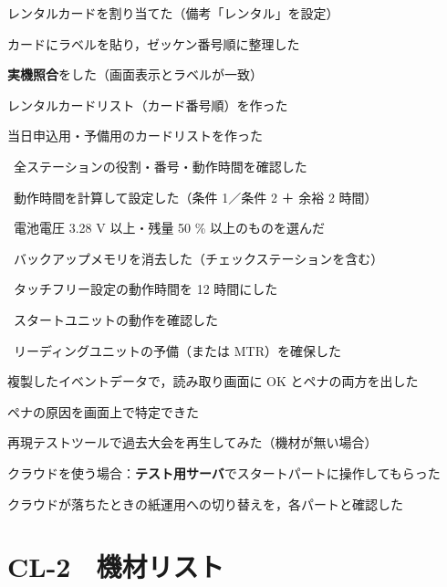 \begin{cklist}
\item レンタルカードを割り当てた（備考「レンタル」を設定）
\item カードにラベルを貼り，ゼッケン番号順に整理した
\item \textbf{実機照合}をした（画面表示とラベルが一致）
\item レンタルカードリスト（カード番号順）を作った
\item 当日申込用・予備用のカードリストを作った
\end{cklist}

\begin{cklist}
\item \tSI\ 全ステーションの役割・番号・動作時間を確認した
\item \tSI\ 動作時間を計算して設定した（条件 1／条件 2 ＋ 余裕 2 時間）
\item \tSI\ 電池電圧 3.28 V 以上・残量 50 \% 以上のものを選んだ
\item \tSI\ バックアップメモリを消去した（チェックステーションを含む）
\item \tSIAC\ タッチフリー設定の動作時間を 12 時間にした
\item \tEMIT\ スタートユニットの動作を確認した
\item \tEMIT\ リーディングユニットの予備（または MTR）を確保した
\end{cklist}

\begin{cklist}
\item 複製したイベントデータで，読み取り画面に OK とペナの両方を出した
\item ペナの原因を画面上で特定できた
\item 再現テストツールで過去大会を再生してみた（機材が無い場合）
\item クラウドを使う場合：\textbf{テスト用サーバ}でスタートパートに操作してもらった
\item クラウドが落ちたときの紙運用への切り替えを，各パートと確認した
\end{cklist}

\ckfoot

\clearpage
\section*{CL-2　機材リスト}

